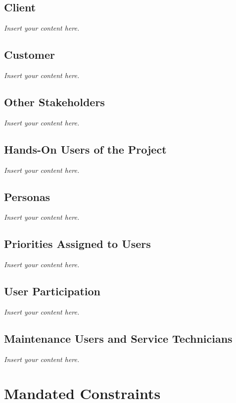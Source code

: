\documentclass[12pt]{article}
\newcommand{\lips}{\textit{Insert your content here.}}
\begin{document}
\subsection{Client}
\lips
\subsection{Customer}
\lips
\subsection{Other Stakeholders}
\lips
\subsection{Hands-On Users of the Project}
\lips
\subsection{Personas}
\lips
\subsection{Priorities Assigned to Users}
\lips
\subsection{User Participation}
\lips
\subsection{Maintenance Users and Service Technicians}
\lips

\section{Mandated Constraints}
\end{document}

